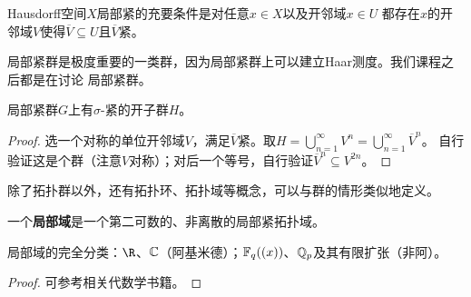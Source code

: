 \begin{remark}
    Hausdorff空间$X$局部紧的充要条件是对任意$x \in X$以及开邻域$x \in U$
    都存在$x$的开邻域$V$使得$\overline{V} \subseteq U$且$\overline{V}$紧。
\end{remark}
局部紧群是极度重要的一类群，因为局部紧群上可以建立Haar测度。我们课程之后都是在讨论
局部紧群。
\begin{proposition}
    局部紧群$G$上有$\sigma$-紧的开子群$H$。
\end{proposition}
\begin{proof}
    选一个对称的单位开邻域$V$，满足$\overline{V}$紧。取$H = \bigcup\limits_{n = 1}^\infty V^n = \bigcup\limits_{n = 1}^\infty \overline{V}^n$。
    自行验证这是个群（注意$V$对称）；对后一个等号，自行验证$\overline{V}^n \subseteq V^{2n}$。
\end{proof}
\begin{remark}
    除了拓扑群以外，还有拓扑环、拓扑域等概念，可以与群的情形类似地定义。
\end{remark}
\begin{definition}
    一个\textbf{局部域}是一个第二可数的、非离散的局部紧拓扑域。
\end{definition}
\begin{proposition}
    局部域的完全分类：$\R$、$\mathbb{C}$（阿基米德）；$\mathbb{F}_q((x))$、$\mathbb{Q}_p$及其有限扩张（非阿）。
\end{proposition}
\begin{proof}
    可参考相关代数学书籍。
\end{proof}


